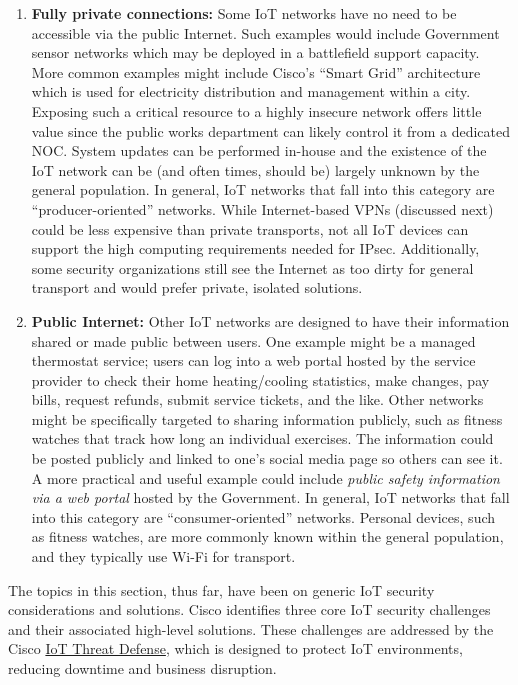 \begin{enumerate}
  \item	\textbf{Fully private connections:} Some IoT networks have no need
  to be accessible via the public Internet. Such examples would include
  Government sensor networks which may be deployed in a battlefield support
  capacity. More common examples might include Cisco’s ``Smart Grid''
  architecture which is used for electricity distribution and management
  within a city. Exposing such a critical resource to a highly insecure
  network offers little value since the public works department can likely
  control it from a dedicated NOC\@. System updates can be performed in-house
  and the existence of the IoT network can be (and often times, should be)
  largely unknown by the general population. In general, IoT networks that
  fall into this category are ``producer-oriented'' networks. While
  Internet-based VPNs (discussed next) could be less expensive than private
  transports, not all IoT devices can support the high computing requirements
  needed for IPsec. Additionally, some security organizations still see the
  Internet as too dirty for general transport and would prefer private,
  isolated solutions.
  \item	\textbf{Public Internet:} Other IoT networks are designed to have their
  information shared or made public between users. One example might be a
  managed thermostat service; users can log into a web portal hosted by the
  service provider to check their home heating/cooling statistics, make
  changes, pay bills, request refunds, submit service tickets, and the like.
  Other networks might be specifically targeted to sharing information
  publicly, such as fitness watches that track how long an individual
  exercises. The information could be posted publicly and linked to one’s
  social media page so others can see it. A more practical and useful example
  could include \textit{public safety information via a web portal} hosted by
  the Government. In general, IoT networks that fall into this category are
  ``consumer-oriented'' networks. Personal devices, such as fitness watches,
  are more commonly known within the general population, and they typically
  use Wi-Fi for transport.
\end{enumerate}

The topics in this section, thus far, have been on generic IoT security
considerations and solutions. Cisco identifies three core IoT security
challenges and their associated high-level solutions. These challenges are
addressed by the Cisco
\href{https://www.cisco.com/c/en/us/solutions/security/iot-threat-defense/index.html}{IoT Threat Defense},
which is designed to protect IoT environments, reducing downtime and business disruption.

